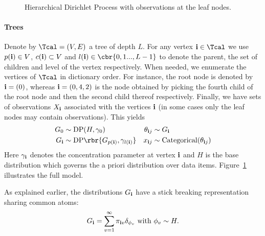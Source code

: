 \documentclass[twoside,11pt]{article}
\newcommand{\ib}{{\bf i}}
\begin{document}
\begin{center}
\begin{figure}
\vspace{-2mm}
\caption{Hierarchical Dirichlet Process with observations at the leaf
  nodes.
  \label{fig:tree}}
\end{figure}
\end{center}
\paragraph{Trees}
Denote by $\Tcal = (V,E)$ a tree of depth $L$. For any vertex $\ib \in
\Tcal$ we use $p(\ib) \in V$, $c(\ib) \subset V$ and
$l(\ib)\in\cbr{0,1...,L-1}$ to denote the parent, the set of children
and level of the vertex respectively. When needed, we enumerate the
vertices of $\Tcal$ in dictionary order. For instance, the root node
is denoted by $\ib = (0)$, whereas $\ib = (0,4,2)$ is the node
obtained by picking the fourth child of the root node and then the
second child thereof respectively. Finally, we have sets of
observations $X_{\ib}$ associated with the vertices $\ib$ (in some
cases only the leaf nodes may contain observations). This yields
\begin{align*}
  G_0 & \sim \mathrm{DP}(H, \gamma_0) &
  \theta_{\ib j} & \sim G_{\ib} \\
  G_{\ib} & \sim \mathrm{DP}\rbr{G_{p(\ib)}, \gamma_{l(\ib)}} &
  x_{\ib j} & \sim \mathrm{Categorical}(\theta_{\ib j})
\end{align*}
Here $\gamma_{\ib}$ denotes the concentration parameter at vertex
$\ib$ and $H$ is the base distribution which governs the a priori
distribution over data items. Figure~\ref{fig:tree} illustrates the full model.



As explained earlier, the distributions $G_\ib$ have a stick breaking representation sharing common atoms:
\begin{equation}
G_\ib = \sum_{v=1}^\infty \pi_{\ib v}\delta_{\phi_v} \text{ with } \phi_v
\sim H.
\end{equation}
\end{document}
